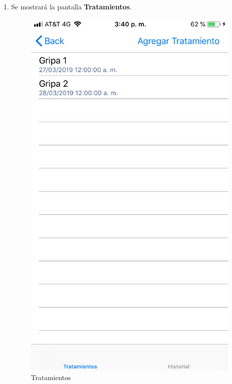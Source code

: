 \begin{enumerate}
	\item Se mostrará la pantalla \textbf{Tratamientos}. 
	\newpage
	\begin{figure}[!htbp]			
		\hypertarget{fig:Tratamientos3}{\hspace{1pt}}
		\begin{center}
			\includegraphics[height=0.4\textheight]{Paciente/AgregarTratamiento/images/Tratamientos}
			\caption{Tratamientos}
			\label{fig:Tratamientos3}
		\end{center}
	\end{figure}


\end{enumerate}
